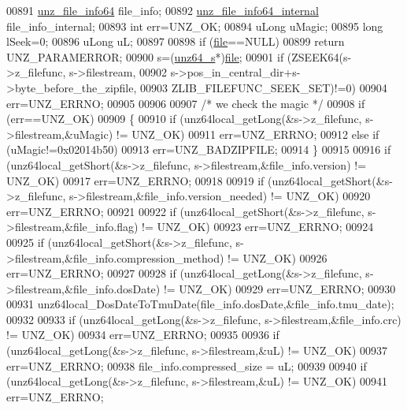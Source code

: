 \begin{DoxyCode}
00891     \hyperlink{structunz__file__info64__s}{unz\_file\_info64} file\_info;
00892     \hyperlink{structunz__file__info64__internal__s}{unz\_file\_info64\_internal} file\_info\_internal;
00893     \textcolor{keywordtype}{int} err=UNZ\_OK;
00894     uLong uMagic;
00895     \textcolor{keywordtype}{long} lSeek=0;
00896     uLong uL;
00897 
00898     \textcolor{keywordflow}{if} (\hyperlink{structfile}{file}==NULL)
00899         \textcolor{keywordflow}{return} UNZ\_PARAMERROR;
00900     s=(\hyperlink{structunz64__s}{unz64\_s}*)\hyperlink{structfile}{file};
00901     \textcolor{keywordflow}{if} (ZSEEK64(s->z\_filefunc, s->filestream,
00902               s->pos\_in\_central\_dir+s->byte\_before\_the\_zipfile,
00903               ZLIB\_FILEFUNC\_SEEK\_SET)!=0)
00904         err=UNZ\_ERRNO;
00905 
00906 
00907     \textcolor{comment}{/* we check the magic */}
00908     \textcolor{keywordflow}{if} (err==UNZ\_OK)
00909     \{
00910         \textcolor{keywordflow}{if} (unz64local\_getLong(&s->z\_filefunc, s->filestream,&uMagic) != UNZ\_OK)
00911             err=UNZ\_ERRNO;
00912         \textcolor{keywordflow}{else} \textcolor{keywordflow}{if} (uMagic!=0x02014b50)
00913             err=UNZ\_BADZIPFILE;
00914     \}
00915 
00916     \textcolor{keywordflow}{if} (unz64local\_getShort(&s->z\_filefunc, s->filestream,&file\_info.version) != UNZ\_OK)
00917         err=UNZ\_ERRNO;
00918 
00919     \textcolor{keywordflow}{if} (unz64local\_getShort(&s->z\_filefunc, s->filestream,&file\_info.version\_needed) != UNZ\_OK)
00920         err=UNZ\_ERRNO;
00921 
00922     \textcolor{keywordflow}{if} (unz64local\_getShort(&s->z\_filefunc, s->filestream,&file\_info.flag) != UNZ\_OK)
00923         err=UNZ\_ERRNO;
00924 
00925     \textcolor{keywordflow}{if} (unz64local\_getShort(&s->z\_filefunc, s->filestream,&file\_info.compression\_method) != UNZ\_OK)
00926         err=UNZ\_ERRNO;
00927 
00928     \textcolor{keywordflow}{if} (unz64local\_getLong(&s->z\_filefunc, s->filestream,&file\_info.dosDate) != UNZ\_OK)
00929         err=UNZ\_ERRNO;
00930 
00931     unz64local\_DosDateToTmuDate(file\_info.dosDate,&file\_info.tmu\_date);
00932 
00933     \textcolor{keywordflow}{if} (unz64local\_getLong(&s->z\_filefunc, s->filestream,&file\_info.crc) != UNZ\_OK)
00934         err=UNZ\_ERRNO;
00935 
00936     \textcolor{keywordflow}{if} (unz64local\_getLong(&s->z\_filefunc, s->filestream,&uL) != UNZ\_OK)
00937         err=UNZ\_ERRNO;
00938     file\_info.compressed\_size = uL;
00939 
00940     \textcolor{keywordflow}{if} (unz64local\_getLong(&s->z\_filefunc, s->filestream,&uL) != UNZ\_OK)
00941         err=UNZ\_ERRNO;

\end{DoxyCode}
